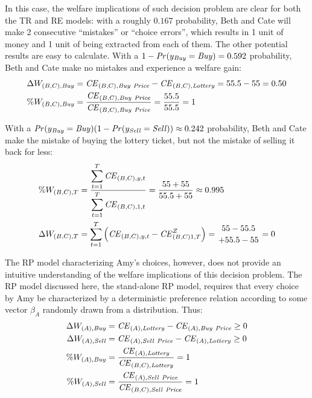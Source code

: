 \documentclass[../main.tex]{subfiles}
\begin{document}
In this case, the welfare implications of such decision problem are clear for both the TR and RE  models: with a roughly $0.167$ probability, Beth and Cate will make 2 consecutive \enquote{mistakes} or \enquote{choice errors}, which results in 1 unit of money and 1 unit of {\CE} being extracted from each of them.
The other potential results are easy to calculate.
With a ${1- {\mathit{Pr}}(y_{\mathit{Buy}}} = \mathit{Buy}) = 0.592$ probability, Beth and Cate make no mistakes and experience a welfare gain:
\begin{align}
	\begin{split}
		\Delta W_{(B,C),\mathit{Buy}} &= {\mathit{CE}}_{(B,C),\mathit{Buy\ Price}} - {\mathit{CE}}_{(B,C),\mathit{Lottery}} = 55.5 - 55 = 0.50\\
		\% W_{(B,C),\mathit{Buy}} &= \frac{{\mathit{CE}}_{(B,C),\mathit{Buy\ Price}}}{{\mathit{CE}}_{(B,C),\mathit{Buy\ Price}}} = \frac{55.5}{55.5} = 1
	\end{split}
\end{align}

With a $ {\mathit{Pr}}(y_{\mathit{Buy}} = \mathit{Buy})(1 - {\mathit{Pr}}(y_{\mathit{Sell}}= \mathit{Sell})) \approx 0.242$ probability, Beth and Cate make the mistake of buying the lottery ticket, but not the mistake of selling it back for less:
\begin{align}
	\begin{split}
		\%W_{(B,C),T} &= \frac{\displaystyle\sum_{t=1}^{T} {\CE}_{(B,C),y,t} }{\displaystyle\sum_{t=1}^{T} {\CE}_{(B,C),1,t}} = \frac{55 + 55}{55.5 + 55} \approx 0.995 \\
		\Delta W_{(B,C),T} &= \sum_{t=1}^T \left( {\CE}_{(B,C),y,t} - {\CE}_{(B,C)1,T}^Z \right)= \genfrac{}{}{0pt}{}{55 - 55.5}{+ 55.5 - 55} = 0
	\end{split}
\end{align}

The RP model characterizing Amy's choices, however, does not provide an intuitive understanding of the welfare implications of this decision problem.
The RP model discussed here, the stand-alone RP model, requires that every choice by Amy be characterized by a deterministic preference relation according to some vector $\beta_A$ randomly drawn from a distribution.
Thus:
\begin{align}
	\label{eq2:RP.welfare}
	\begin{split}
		\Delta W_{(A),\mathit{Buy}} &= {\mathit{CE}}_{(A),\mathit{Lottery}} - {\mathit{CE}}_{(A),\mathit{Buy\ Price}} \geq 0\\
		\Delta W_{(A),\mathit{Sell}} &= {\mathit{CE}}_{(A),\mathit{Sell\ Price}} - {\mathit{CE}}_{(A),\mathit{Lottery}} \geq 0\\
		\% W_{(A),\mathit{Buy}} &= \frac{{\mathit{CE}}_{(A),\mathit{Lottery}}}{{\mathit{CE}}_{(B,C),\mathit{Lottery}}} = 1\\
		\% W_{(A),\mathit{Sell}} &= \frac{{\mathit{CE}}_{(A),\mathit{Sell\ Price}}}{{\mathit{CE}}_{(B,C),\mathit{Sell\ Price}}} = 1
	\end{split}
\end{align}
\end{document}
